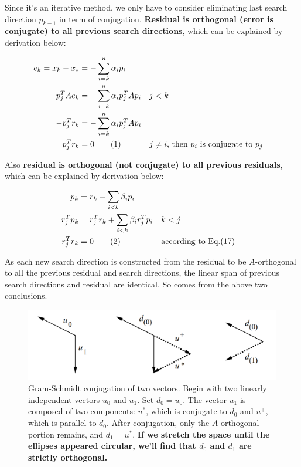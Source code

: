 \documentclass{article}
\newcommand\numberthis{\addtocounter{equation}{1}\tag{\theequation}}
\begin{document}
 Since it's an iterative method, we only have to consider eliminating last search direction $p_{k-1}$ in term of conjugation. \textbf{Residual is orthogonal (error is conjugate) to all previous search directions}, which can be explained by derivation below:
 
 \begin{align*}
     e_k=x_k-x_*&=-\sum^n_{i=k}\alpha_ip_i\\
     p^T_jAe_k&=-\sum^n_{i=k}\alpha_ip_j^TAp_i &&\text{$j<k$}\\
     -p_j^Tr_k&=-\sum^n_{i=k}\alpha_ip_j^TAp_i\\
     p_j^Tr_k&=0\numberthis &&\text{$j\not=i$, then $p_i$ is conjugate to $p_j$}
 \end{align*}
 
 Also \textbf{residual is orthogonal (not conjugate) to all previous residuals}, which can be explained by derivation below:
 
 \begin{align*}
     p_k&=r_k+\sum_{i<k}\beta_ip_i\\
     r_j^Tp_k&=r_j^Tr_k+\sum_{i<k}\beta_ir_j^Tp_i &&\text{$k<j$}\\
     r_j^Tr_k&=0\numberthis &&\text{according to Eq.(17)}
 \end{align*}
 
 As each new search direction is constructed from the residual to be $A$-orthogonal to all the previous residual and search directions, the linear span of previous search directions and residual are identical. So comes from the above two conclusions.

\begin{figure}[H]
    \centering
    \includegraphics[scale=0.3]{Gram-Schmidt_conjuga}
    \caption{Gram-Schmidt conjugation of two vectors. Begin with two linearly independent vectors $u_0$ and
$u_1$. Set $d_0=u_0$. The vector $u_1$ is composed of two components: $u^*$, which is conjugate to $d_0$ and $u^+$, which is parallel to $d_0$. After conjugation, only the $A$-orthogonal portion remains, and $d_1=u^*$. \textbf{If we stretch the space until the ellipses appeared circular, we'll find that $d_0$ and $d_1$ are strictly orthogonal.}}
    \label{fig:gram}
\end{figure}
\end{document}
